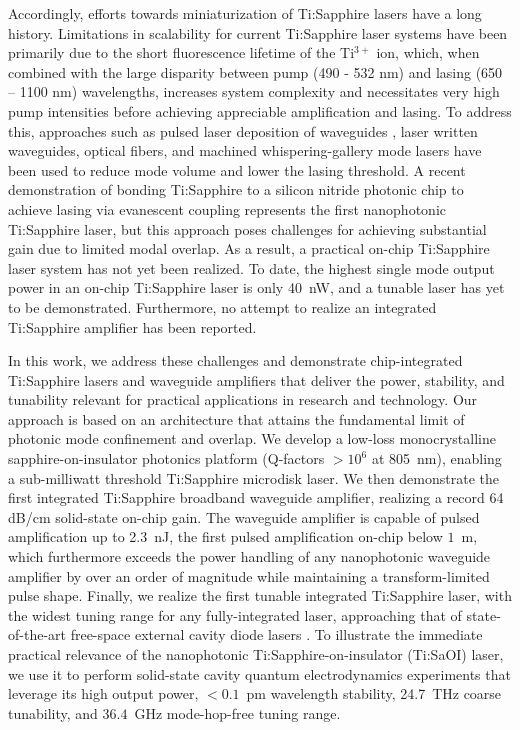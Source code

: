 \documentclass[amsmath, amsthm, amssymb, aps, prb, superscriptaddress, twocolumn, nofootinbib, 10pt]{revtex4-1}%
\begin{document}
Accordingly, efforts towards miniaturization of Ti:Sapphire lasers have a long history.  Limitations in scalability for current Ti:Sapphire laser systems have been primarily due to the short fluorescence lifetime of the Ti$^{3+}$ ion, which, when combined with the large disparity between pump (490 - 532 nm) and lasing (650 – 1100 nm) wavelengths, increases system complexity and necessitates very high pump intensities before achieving appreciable amplification and lasing. To address this, approaches such as pulsed laser deposition of waveguides \cite{grivas2005single}, laser written waveguides\cite{grivas2018generation, grivas2012tunable}, optical fibers\cite{yang2019widely, wang2016laser}, and machined whispering-gallery mode lasers\cite{azeem2022ultra} have been used to reduce mode volume and lower the lasing threshold. A recent demonstration of bonding Ti:Sapphire to a silicon nitride photonic chip to achieve lasing via evanescent coupling represents the first nanophotonic Ti:Sapphire laser\cite{wang2023photonic}, but this approach poses challenges for achieving substantial gain due to limited modal overlap. As a result, a practical on-chip Ti:Sapphire laser system has not yet been realized. To date, the highest single mode output power in an on-chip Ti:Sapphire laser is only 40~nW\cite{wang2023photonic}, and a tunable laser has yet to be demonstrated. Furthermore, no attempt to realize an integrated Ti:Sapphire amplifier has been reported. 

In this work, we address these challenges and demonstrate chip-integrated Ti:Sapphire lasers and waveguide amplifiers that deliver the power, stability, and tunability relevant for practical applications in research and technology. Our approach is based on an architecture that attains the fundamental limit of photonic mode confinement and overlap. We develop a low-loss monocrystalline sapphire-on-insulator photonics platform (Q-factors $>10^6$ at 805~nm), enabling a sub-milliwatt threshold Ti:Sapphire microdisk laser. 
We then demonstrate the first integrated Ti:Sapphire broadband waveguide amplifier, realizing a record 64 dB/cm solid-state on-chip gain. The waveguide amplifier is capable of pulsed amplification up to 2.3~nJ, the first pulsed amplification on-chip below $1$~\textmu m, which furthermore exceeds the power handling of any nanophotonic waveguide amplifier by over an order of magnitude\cite{liu2022photonic, shtyrkova2019integrated} while maintaining a transform-limited pulse shape.
Finally, we realize the first tunable integrated Ti:Sapphire laser, with the widest tuning range for any fully-integrated laser\cite{corato2023widely, guo2022hybrid, guo2023band}, approaching that of state-of-the-art free-space external cavity diode lasers \cite{mandelis2022review}. To illustrate the immediate practical relevance of the nanophotonic Ti:Sapphire-on-insulator (Ti:SaOI) laser, we use it to perform solid-state cavity quantum electrodynamics experiments that leverage its high output power, $<0.1$~pm wavelength stability, 24.7~THz coarse tunability, and $36.4$~GHz mode-hop-free tuning range. 
\end{document}
